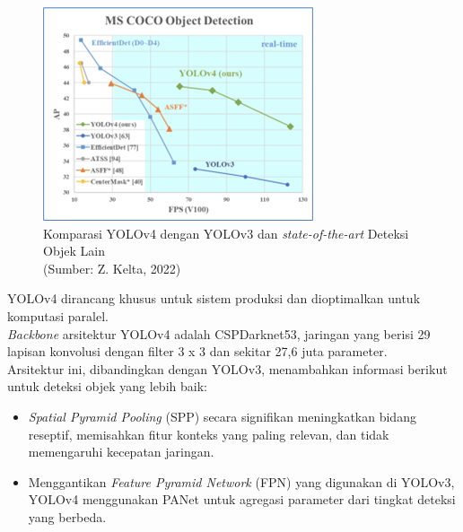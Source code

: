 \begin{enumerate}
	\begin{figure}[H]
		\vspace{-0.1cm}
		\begin{center}
			\includegraphics[width=0.8\columnwidth]{bab2/Gambar/Picture37.png}
		\end{center}
		\vspace{-0.2cm}
		\captionsetup{justification=centering}
		\caption{Komparasi YOLOv4 dengan YOLOv3 dan \textit{state-of-the-art} Deteksi Objek Lain \\(Sumber: Z. Kelta, 2022)}\label{img:KomprasiYoloV4-YoloV3}
	\end{figure}
	YOLOv4 dirancang khusus untuk sistem produksi dan dioptimalkan untuk komputasi paralel.\\
	\textit{Backbone} arsitektur YOLOv4 adalah CSPDarknet53, jaringan yang berisi 29 lapisan konvolusi dengan filter 3 x 3 dan sekitar 27,6 juta parameter.\\
	Arsitektur ini, dibandingkan dengan YOLOv3, menambahkan informasi berikut untuk deteksi objek yang lebih baik:
	
	\begin{itemize}
		\item \textit{Spatial Pyramid Pooling} (SPP) secara signifikan meningkatkan bidang reseptif, memisahkan fitur konteks yang paling relevan, dan tidak memengaruhi kecepatan jaringan.
		
		\item Menggantikan \textit{Feature Pyramid Network} (FPN) yang digunakan di YOLOv3, YOLOv4 menggunakan PANet untuk agregasi parameter dari tingkat deteksi yang berbeda.
		

\end{itemize}
\end{enumerate}
